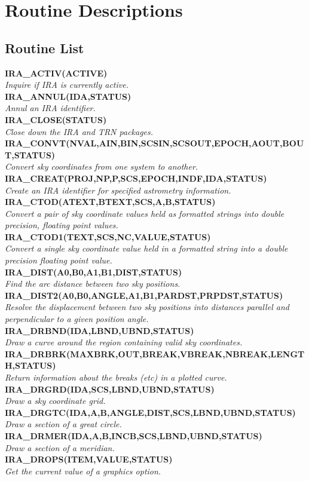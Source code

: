 \appendix
\section {Routine Descriptions}

\newcommand{\noteroutine}[2]{{\small \bf #1} \\
                              \hspace*{3em} {\em #2} \\[1.5ex]}

\subsection {Routine List}
\noteroutine{IRA\_ACTIV(ACTIVE)}
   {Inquire if IRA is currently active.}
\noteroutine{IRA\_ANNUL(IDA,STATUS)}
   {Annul an IRA identifier.}
\noteroutine{IRA\_CLOSE(STATUS)}
   {Close down the IRA and TRN packages.}
\noteroutine{IRA\_CONVT(NVAL,AIN,BIN,SCSIN,SCSOUT,EPOCH,AOUT,BOUT,STATUS)}
   {Convert sky coordinates from one system to another.}
\noteroutine{IRA\_CREAT(PROJ,NP,P,SCS,EPOCH,INDF,IDA,STATUS)} 
   {Create an IRA identifier for specified astrometry information.}
\noteroutine{IRA\_CTOD(ATEXT,BTEXT,SCS,A,B,STATUS)}
   {Convert a pair of sky coordinate values held as formatted strings into 
   double precision, floating point values.}
\noteroutine{IRA\_CTOD1(TEXT,SCS,NC,VALUE,STATUS)} 
   {Convert a single sky coordinate value held in a formatted string into a 
   double precision floating point value.}
\noteroutine{IRA\_DIST(A0,B0,A1,B1,DIST,STATUS)}
   {Find the arc distance between two sky positions.}
\noteroutine{IRA\_DIST2(A0,B0,ANGLE,A1,B1,PARDST,PRPDST,STATUS)}
   {Resolve the displacement between two sky positions into distances parallel 
    and perpendicular to a given position angle.}
\noteroutine{IRA\_DRBND(IDA,LBND,UBND,STATUS)}
   {Draw a curve around the region containing valid sky coordinates.}
\noteroutine{IRA\_DRBRK(MAXBRK,OUT,BREAK,VBREAK,NBREAK,LENGTH,STATUS)}
   {Return information about the breaks (etc) in a plotted curve.}
\noteroutine{IRA\_DRGRD(IDA,SCS,LBND,UBND,STATUS)}
   {Draw a sky coordinate grid.}
\noteroutine{IRA\_DRGTC(IDA,A,B,ANGLE,DIST,SCS,LBND,UBND,STATUS)}
   {Draw a section of a great circle.}
\noteroutine{IRA\_DRMER(IDA,A,B,INCB,SCS,LBND,UBND,STATUS)}
   {Draw a section of a meridian.}
\noteroutine{IRA\_DROPS(ITEM,VALUE,STATUS)}
   {Get the current value of a graphics option.}

